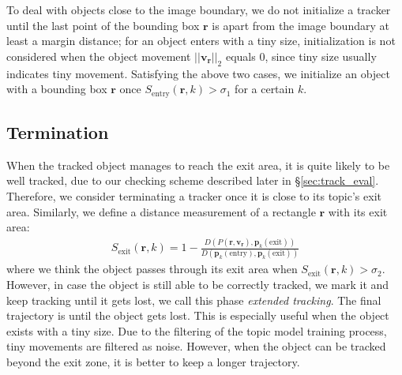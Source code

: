     To deal with objects close to the image boundary, we do not initialize a tracker until the last point of the bounding box $\bm{r}$ is apart from the image boundary at least a margin distance; for an object enters with a tiny size, initialization is not considered when the object movement $||\bm{v_r}||_2$ equals $0$, since tiny size usually indicates tiny movement.
    Satisfying the above two cases, we initialize an object with a bounding box $\bm{r}$ once $S_{\text{entry}}(\bm{r}, k) > \sigma_{1}$ for a certain $k$. 

\subsection{Termination}
    When the tracked object manages to reach the exit area, it is quite likely to be well tracked, due to our checking scheme described later in \S\ref{sec:track_eval}. Therefore, we consider terminating a tracker once it is close to its topic's exit area. 
    Similarly, we define a distance measurement of a rectangle $\bm{r}$ with its exit area:
    \begin{align}
        S_\text{exit}(\bm{r}, k) = 1-\frac{D\left(P(\bm{r}, \bm{v_r}), \bm{p}_k(\text{exit})\right)}{D\left(\bm{p}_k(\text{entry}), \bm{p}_k(\text{exit})\right)}
    \end{align}
    where we think the object passes through its exit area when $S_\text{exit}(\bm{r}, k) > \sigma_2$.
    However, in case the object is still able to be correctly tracked, we mark it and keep tracking until it gets lost, we call this phase \emph{extended tracking}. 
    The final trajectory is until the object gets lost. This is especially useful when the object exists with a tiny size. Due to the filtering of the topic model training process, tiny movements are filtered as noise. However, when the object can be tracked beyond the exit zone, it is better to keep a longer trajectory. 

